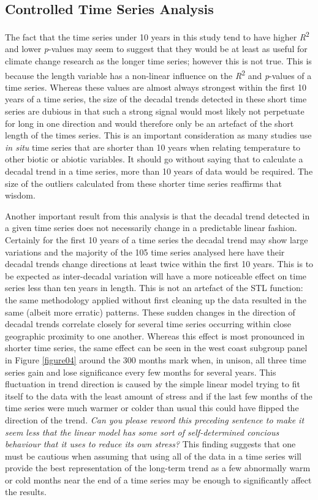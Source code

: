 \documentclass{ametsoc}
\begin{document}
\subsection{Controlled Time Series Analysis}
The fact that the time series under 10 years in this study tend to have higher \emph{R}\textsuperscript{2} and lower \emph{p}-values may seem to suggest that they would be at least as useful for climate change research as the longer time series; however this is not true. This is because the length variable has a non-linear influence on the \emph{R}\textsuperscript{2} and \emph{p}-values of a time series. Whereas these values are almost always strongest within the first 10 years of a time series, the size of the decadal trends detected in these short time series are dubious in that such a strong signal would most likely not perpetuate for long in one direction and would therefore only be an artefact of the short length of the times series. This is an important consideration as many studies use \emph{in situ} time series that are shorter than 10 years when relating temperature to other biotic or abiotic variables. It should go without saying that to calculate a decadal trend in a time series, more than 10 years of data would be required. The size of the outliers calculated from these shorter time series reaffirms that wisdom.

Another important result from this analysis is that the decadal trend detected in a given time series does not necessarily change in a predictable linear fashion. Certainly for the first 10 years of a time series the decadal trend may show large variations and the majority of the 105 time series analysed here have their decadal trends change directions at least twice within the first 10 years. This is to be expected as inter-decadal variation will have a more noticeable effect on time series less than ten years in length. This is not an artefact of the STL function: the same methodology applied without first cleaning up the data resulted in the same (albeit more erratic) patterns. These sudden changes in the direction of decadal trends correlate closely for several time series occurring within close geographic proximity to one another. Whereas this effect is most pronounced in shorter time series, the same effect can be seen in the west coast subgroup panel in Figure \ref{figure04} around the 300 months mark when, in unison, all three time series gain and lose significance every few months for several years. This fluctuation in trend direction is caused by the simple linear model trying to fit itself to the data with the least amount of stress and if the last few months of the time series were much warmer or colder than usual this could have flipped the direction of the trend. \emph{Can you please reword this preceding sentence to make it seem less that the linear model has some sort of self-determined concious behaviour that it uses to reduce its own stress?} This finding suggests that one must be cautious when assuming that using all of the data in a time series will provide the best representation of the long-term trend as a few abnormally warm or cold months near the end of a time series may be enough to significantly affect the results.
\end{document}
